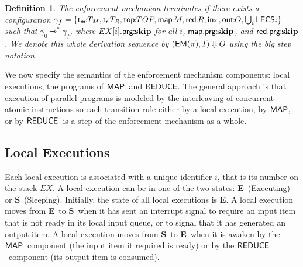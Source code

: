 \documentclass[10pt,a4paper,oneside]{article}
\newtheorem{definition}{Definition}[section]
\def\execution#1#2#3{\ensuremath{(#1, #2)\Downarrow#3}}
\def\sE{\textbf{E}}
\def\sS{\textbf{S}}
\def\TAV{\ensuremath{T_{M}}}
\def\TPV{\ensuremath{T_{R}}}
\def\ST{{\ensuremath{EX}}}
\def\TOP{\ensuremath{TOP}}
\def\lcomma{\ensuremath{\!\!:\!\!}}
\def\sanserif#1{\ensuremath{\sf #1}}
\def\REDUCE{\ensuremath{\sanserif{REDUCE}}}
\def\MAP{\ensuremath{\sanserif{MAP}}}
\def\gconf{\ensuremath{\gamma}}
\def\emptyQ{\ensuremath{\epsilon}}
\def\EM{\ensuremath{{\sanserif{EM}}}}
\def\Prog{\ensuremath{\pi}}
\def\EMP{\ensuremath{\EM(}\ensuremath{\Prog)}}
\def\NSKIP{skip}
\def\iskip{\ensuremath{\textbf{\NSKIP}}}
\def\lprog{{\sf prg}}
\def\lprogm{{\sf prg}}
\def\lprogr{{\sf prg}}
\def\linput{{\sf in}}
\def\loutput{{\sf out}}
\def\ltav{\ensuremath{{\sf t_{m}}}}
\def\ltpv{\ensuremath{{\sf t_{r}}}}
\def\ltop{{\sf top}}
\def\LECS{{\sf \ensuremath{LECS}}}
\def\LECSI{\ensuremath{\LECS_{i}}}
\def\LECSUIR#1#2{\ensuremath{\bigcup_{#1}#2}}
\def\lmap{{\sf map}}
\def\lreduce{{\sf red}}
\def\CMAP{{\ensuremath{M}}}
\def\CREDUCE{{\ensuremath{R}}}
\begin{document}
\begin{definition}\label{def:termination:em}
The enforcement mechanism \emph{terminates} if there exists a configuration $\gconf_f = \{\ltav\lcomma\TAV, \ltpv\lcomma\TPV, \ltop\lcomma\TOP, \lmap\lcomma\CMAP, \lreduce\lcomma\CREDUCE, \linput\lcomma \emptyQ, \loutput\lcomma O, \LECSUIR{i}{\LECSI} \}$ such that $\gconf_0 \rightarrowtriangle^* \gconf_f$, where $\ST[i].\lprog\lcomma\iskip$ for all $i$, $\lmap.\lprogm\lcomma\iskip$, and $\lreduce.\lprogr\lcomma\iskip$. We denote this whole derivation sequence by $\execution{\EMP}{I}{O}$ using the big step notation.
\end{definition}

\iffalse
\begin{definition}\label{def:termination:em}
The enforcement mechanism \emph{terminates} if there exists a configuration $\gconf_f = \{\ltav\lcomma\TAV, \ltpv\lcomma\TPV, \ltop\lcomma\TOP, \lmap\lcomma\CMAP, \lreduce\lcomma\CREDUCE, \linput\lcomma \emptyQ, \loutput\lcomma O, \LECSUIR{i}{\LECSI} \}$ such that $\gconf_0 \rightarrowtriangle^* \gconf_f$, where $\ST[i].\lprog\lcomma\iskip$ for all $i$, $\lmap.\lprogm\lcomma\iskip$, and $\lreduce.\lprogr\lcomma\iskip$. We denote this whole derivation sequence by $\execution{\EMP}{I}{O}$ using the big step notation.
\end{definition}
\fi

We now specify the semantics of the enforcement mechanism components: local executions, the programs of \MAP\ and \REDUCE. The general approach is that execution of parallel programs is modeled by the interleaving of concurrent atomic instructions \cite{Lamport-83-SCP} so each transition rule either by a local execution, by \MAP, or by \REDUCE\ is a step of the enforcement mechanism as a whole.

\subsection{Local Executions}\label{sec:formalization:locExec}
Each local execution is associated with a unique identifier $i$, that is its number on the stack \ST. A local execution can be in one of the two states: \sE\ (Executing) or \sS\ (Sleeping). Initially, the state of all local executions is \sE. A local execution moves from \sE\ to \sS\ when it has sent an interrupt signal to require an input item that is not ready in its local input queue, or to signal that it has generated an output item. A local execution moves from \sS\ to \sE\ when it is awaken by the \MAP\ component (the input item it required is ready) or by the \REDUCE\ component (its output item is consumed).
\end{document}

